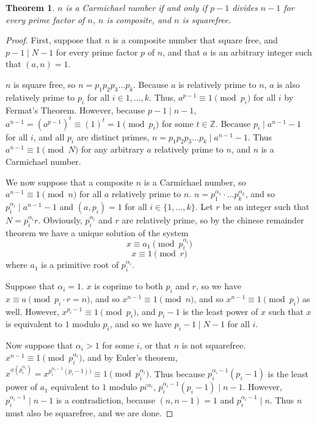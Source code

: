 \documentclass{article}
\newtheorem*{theorem}{Theorem}
\begin{document}
\begin{theorem} $n$ is a Carmichael number if and only if $p-1$ divides $n-1$ for every prime factor of $n$, $n$ is composite, and $n$ is squarefree.
\end{theorem}

\begin{proof}
First, suppose that $n$ is a composite number that square free, and $p-1 \mid N-1$ for every prime factor $p$ of $n$, and that $a$ is an arbitrary integer such that $(a,n) = 1$.
\par $n$ is square free, so $n = p_1 p_2 p_3 \ldots p_k$. Because $a$ is relatively prime to $n$, $a$ is also relatively prime to $p_i$ for all $i \in {1, \ldots, k}$. Thus, $a^{p-1} \equiv 1 \pmod{p_i}$ for all $i$ by Fermat's Theorem. However, because $p -1 \mid n -1$, $a^{n-1} = (a^{p-1})^t \equiv (1)^t = 1 \pmod{p_i}$ for some $t \in \mathbb Z$. Because $p_i \mid a^{n-1} - 1$ for all $i$, and all $p_i$ are distinct primes, $n = p_1p_2p_3 \ldots p_k \mid a^{n-1} - 1$. Thus $a^{n-1} \equiv 1 \pmod N$ for any arbitrary $a$ relatively prime to $n$, and $n$ is a Carmichael number.
\par
We now suppose that a composite $n$ is a Carmichael number, so $a^{n-1} \equiv 1 \pmod n$ for all $a$ relatively prime to $n$. $n = p_1^{\alpha_1}\cdot \ldots p_k^{\alpha_k}$, and so $p_i^{\alpha_i} \mid a^{n-1} - 1 $ and $(a,p_i) = 1$ for all $i \in \{1, \ldots, k\}$. Let $r$ be an integer such that $N = p_i^{\alpha_i} r$. Obviously, $p_i^{\alpha_i}$ and $r$ are relatively prime, so by the chinese remainder theorem we have a unique solution of the system
	$$x \equiv a_1 \pmod{p_i^{\alpha_i}}$$
	$$x \equiv 1 \pmod{r}$$
where $a_1$ is a primitive root of $p_i^{\alpha_i}$. 
\par Suppose that $\alpha_i = 1$. $x$ is coprime to both $p_i$ and $r$, so we have $x \equiv a \pmod{p_i \cdot r = n}$, and so $x^{n-1} \equiv 1 \pmod n$, and so $x^{n-1} \equiv 1 \pmod p_i$ as well. However, $x^{p_i - 1} \equiv 1 \pmod{p_i}$, and $p_i - 1$ is the least power of $x$ such that $x$ is equivalent to $1$ modulo $p_i$, and so we have $p_i -1 \mid N - 1$ for all $i$. 
\par Now suppose that $\alpha_i >1$ for some $i$, or that $n$ is not squarefree. $x^{n-1} \equiv 1 \pmod{p_i^{\alpha_i}}$, and by Euler's theorem, $x^{\phi(p_i^{\alpha_i})} = x^{p_i^{\alpha_i - 1}(p_i - 1))}  \equiv 1 \pmod{p_i^{\alpha_i}}$. Thus because $p_i^{\alpha_i -1}(p_i - 1)$ is the least power of $a_1$ equivalent to $1$ modulo $pi^{\alpha_i}$, $p_i^{\alpha_i -1}(p_i - 1) \mid n - 1$. However, $p_i^{\alpha_i - 1} \mid n - 1$ is a contradiction, because $(n, n-1) = 1$ and $p_i^{\alpha_i - 1} \mid n$. Thus $n$ must also be squarefree, and we are done. 
\end{proof}
\end{document}
